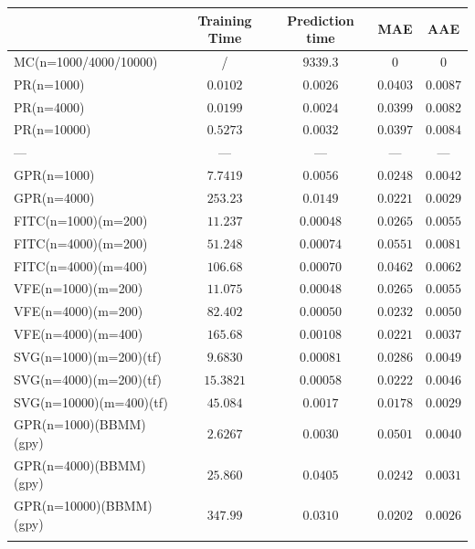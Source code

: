 \documentclass[12pt,a4paper,oneside]{book}
\begin{document}
\begin{table}\centering 
\begin{tabular}[t]{lcccc}\toprule
            &   Training Time  &  Prediction time &  MAE & AAE   \\ \midrule
MC(n=1000/4000/10000)    &/ & $9339.3$ &  $0$  &  $0$    \\\addlinespace
PR(n=1000)   & $0.0102$ &  $0.0026$   & $0.0403$ &   $0.0087$   \\\addlinespace
PR(n=4000)   & $0.0199$ &  $0.0024$   & $0.0399$ & $0.0082$     \\\addlinespace
PR(n=10000)	  & $0.5273$ & $0.0032$    & $0.0397$ &  $0.0084$     \\\addlinespace
\qquad \qquad \qquad \qquad \qquad ---	  &   --- & --- & --- & ---     \\\addlinespace
GPR(n=1000)   & $7.7419$ &  $0.0056$   & $0.0248$ &  $0.0042$   \\\addlinespace
GPR(n=4000)   & $253.23$  &  $0.0149$   & $0.0221$  &  $0.0029$    \\\addlinespace
FITC(n=1000)(m=200)  & $11.237$ & $0.00048$    & $0.0265$ & $0.0055$  \\\addlinespace
FITC(n=4000)(m=200)   & $51.248$ & $0.00074$    & $0.0551$ &  $0.0081$   \\\addlinespace
FITC(n=4000)(m=400)	 & $106.68$ &  $0.00070$   & $0.0462$  &  $0.0062$   \\\addlinespace
VFE(n=1000)(m=200)  & $11.075$ & $0.00048$    & $0.0265$ & $0.0055$  \\\addlinespace
VFE(n=4000)(m=200)   & $82.402$  & $0.00050$    & $0.0232$ &  $0.0050$   \\\addlinespace
VFE(n=4000)(m=400)	 & $165.68$  & $0.00108$    & $0.0221$ & $0.0037$    \\\addlinespace
SVG(n=1000)(m=200)(tf)  & $9.6830$ & $0.00081$    & $0.0286$ & $0.0049$  \\\addlinespace
SVG(n=4000)(m=200)(tf)  & $15.3821$ & $0.00058$   & $0.0222$ & $0.0046$  \\\addlinespace
SVG(n=10000)(m=400)(tf)	  & $45.084$  & $0.0017$    & $0.0178$ & $0.0029$  \\\addlinespace
GPR(n=1000)(BBMM)(gpy)  & $\bm{2.6267}$  & $0.0030$    & $0.0501$ &  $0.0040$     \\\addlinespace
GPR(n=4000)(BBMM)(gpy)  & $25.860$  & $0.0405$    & $0.0242$ & $0.0031$  \\\addlinespace
GPR(n=10000)(BBMM)(gpy)  & $347.99$ & $0.0310$    & $0.0202$ & $0.0026$  \\\addlinespace

\end{tabular}
\end{table}
\end{document}

